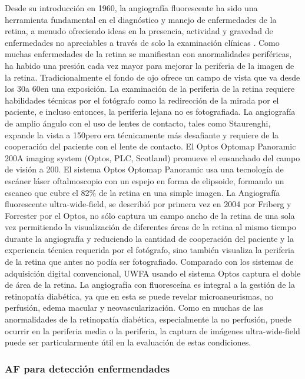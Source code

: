 Desde su introducción en 1960, la angiografía fluorescente ha sido una herramienta fundamental en el diagnóstico y manejo de enfermedades de la retina, a menudo ofreciendo ideas en la presencia, actividad y gravedad de enfermedades no apreciables a través de solo la examinación clínicas . Como muchas enfermedades de la retina se manifiestan con anormalidades periféricas, ha habido una presión cada vez mayor para mejorar la periferia de la imagen de la retina. Tradicionalmente el fondo de ojo ofrece un campo de vista que va desde los 30\degree a 60\degree en una exposición. La examinación de la periferia de la retina requiere habilidades técnicas   por el fotógrafo como la redirección de la mirada por el paciente, e incluso entonces, la periferia lejana no es fotografiada.
La angiografía de amplio ángulo con el uso de lentes de contacto, tales como  Staurenghi, expande la vista a 150\degree pero era técnicamente más desafiante y requiere de la cooperación del paciente con el lente de contacto. El Optos Optomap Panoramic
200A imaging system (Optos, PLC, Scotland) promueve el ensanchado del campo de visión a 200\degree. El sistema  Optos Optomap Panoramic usa una tecnología de escáner láser oftalmoscopio con un espejo en forma de elipsoide, formando un escaneo que cubre el 82\% de la retina en  una simple imagen.
La Angiografía  fluorescente ultra-wide-field, se describió por primera vez en 2004 por Friberg y Forrester por el Optos, no sólo captura un campo ancho de la retina de una sola vez  permitiendo la visualización de diferentes áreas de la retina  al mismo  tiempo durante
la angiografía y reduciendo la cantidad de cooperación del paciente y la experiencia técnica requerida por el fotógrafo, sino también visualiza la periferia de la retina que antes no podía ser fotografiado. Comparado con los sistemas de adquisición digital convencional, UWFA usando el sistema Optos  captura el doble de área de la retina.
La angiografía con fluoresceína es integral a la gestión de la retinopatía diabética, ya que en esta se puede revelar microaneurismas, no perfusión, edema macular y neovascularización. Como en muchas de las anormalidades de la retinopatía diabética, especialmente la no perfusión, puede ocurrir en la periferia media o la periferia, la captura de imágenes ultra-wide-field puede ser particularmente útil en la evaluación de estas condiciones.\cite{patel2014ultra}




\subsubsection{AF para detección enfermendades }

